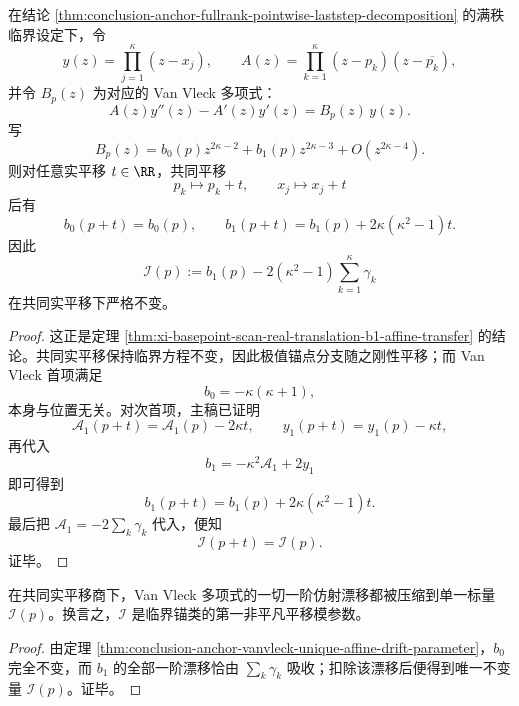 \begin{theorem}\label{thm:conclusion-anchor-vanvleck-unique-affine-drift-parameter}
在结论 \ref{thm:conclusion-anchor-fullrank-pointwise-laststep-decomposition} 的满秩临界设定下，令
\[
y(z)=\prod_{j=1}^{\kappa}(z-x_j),
\qquad
A(z)=\prod_{k=1}^{\kappa}(z-p_k)(z-\overline{p_k}),
\]
并令 \(B_p(z)\) 为对应的 Van Vleck 多项式：
\[
A(z)y''(z)-A'(z)y'(z)=B_p(z)\,y(z).
\]
写
\[
B_p(z)=b_0(p)z^{2\kappa-2}+b_1(p)z^{2\kappa-3}+O(z^{2\kappa-4}).
\]
则对任意实平移 \(t\in\RR\)，共同平移
\[
p_k\mapsto p_k+t,
\qquad
x_j\mapsto x_j+t
\]
后有
\[
b_0(p+t)=b_0(p),
\qquad
b_1(p+t)=b_1(p)+2\kappa(\kappa^2-1)t.
\]
因此
\[
\mathcal I(p):=
b_1(p)-2(\kappa^2-1)\sum_{k=1}^{\kappa}\gamma_k
\]
在共同实平移下严格不变。
\end{theorem}
\begin{proof}
这正是定理 \ref{thm:xi-basepoint-scan-real-translation-b1-affine-transfer} 的结论。共同实平移保持临界方程不变，因此极值锚点分支随之刚性平移；而 Van Vleck 首项满足
\[
b_0=-\kappa(\kappa+1),
\]
本身与位置无关。对次首项，主稿已证明
\[
\mathcal A_1(p+t)=\mathcal A_1(p)-2\kappa t,
\qquad
y_1(p+t)=y_1(p)-\kappa t,
\]
再代入
\[
b_1=-\kappa^2\mathcal A_1+2y_1
\]
即可得到
\[
b_1(p+t)=b_1(p)+2\kappa(\kappa^2-1)t.
\]
最后把 \(\mathcal A_1=-2\sum_k\gamma_k\) 代入，便知
\[
\mathcal I(p+t)=\mathcal I(p).
\]
证毕。
\end{proof}

\begin{corollary}[共同实平移商下的第一非平凡模参数]\label{cor:conclusion-anchor-vanvleck-first-translation-modulus}
在共同实平移商下，Van Vleck 多项式的一切一阶仿射漂移都被压缩到单一标量 \(\mathcal I(p)\)。换言之，\(\mathcal I\) 是临界锚类的第一非平凡平移模参数。
\end{corollary}
\begin{proof}
由定理 \ref{thm:conclusion-anchor-vanvleck-unique-affine-drift-parameter}，\(b_0\) 完全不变，而 \(b_1\) 的全部一阶漂移恰由 \(\sum_k\gamma_k\) 吸收；扣除该漂移后便得到唯一不变量 \(\mathcal I(p)\)。证毕。
\end{proof}

